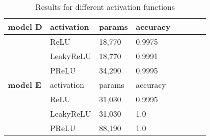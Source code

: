 \documentclass[conference,compsoc]{IEEEtran}
\begin{document}
\begin{table}
\begin{subtable}[t]{0.48\textwidth}
\centering
\begin{tabular}[t]{l l l l l l |l l}
\toprule
 \textbf{model D} & activation &   params &accuracy\\
\midrule
  & ReLU &  18,770 & 0.9975 &\\
  &LeakyReLU & 18,770 & 0.9991& \\
    & PReLU  &   34,290  &  0.9995  \\
    
\midrule                                                  
   \textbf{model E} & activation &   params &accuracy\\
\midrule
  & ReLU &  31,030 & 0.9995 &\\
  &LeakyReLU & 31,030 & 1.0 & \\
    & PReLU & 88,190 &    1.0   &        \\
    
\bottomrule
\end{tabular}


\end{subtable}
\caption{Results for different activation functions}
\label{acti}
\end{table}

  











\end{document}
